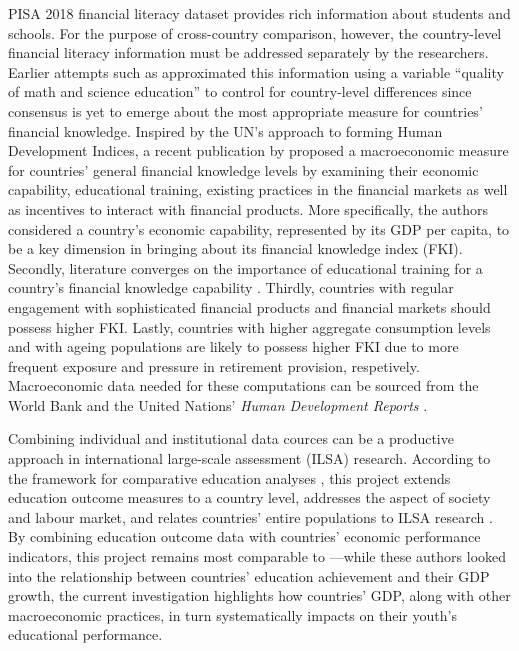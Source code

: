 \documentclass[a4paper,11pt,UKenglish,twoside,openright]{report}\usepackage[]{graphicx}\usepackage[]{color}
\begin{document}
PISA 2018 financial literacy dataset \parencite{FLdata} provides rich information about students and schools. For the purpose of cross-country comparison, however, the country-level financial literacy information must be addressed separately by the researchers. Earlier attempts such as \textcite{morenoherrero:2018a} approximated this information using a variable ``quality of math and science education'' to control for country-level differences since consensus is yet to emerge about the most appropriate measure for countries' financial knowledge. Inspired by the UN's approach to forming Human Development Indices, a recent publication by \textcite{olivermarquez:2020} proposed a macroeconomic measure for countries' general financial knowledge levels by examining their economic capability, educational training, existing practices in the financial markets as well as incentives to interact with financial products. More specifically, the authors considered a country's economic capability, represented by its GDP per capita, to be a key dimension in bringing about its financial knowledge index (FKI). Secondly, literature converges on the importance of educational training for a country's financial knowledge capability \parencite{oecd:2005}. Thirdly, countries with regular engagement with sophisticated financial products and financial markets should possess higher FKI. Lastly, countries with higher aggregate consumption levels and with ageing populations are likely to possess higher FKI due to more frequent exposure and pressure in retirement provision, respetively. Macroeconomic data needed for these computations can be sourced from the World Bank \parencite{worldbank:data} and the United Nations' \textit{Human Development Reports} \parencite{hdr:data}.

Combining individual and institutional data cources can be a productive approach in international large-scale assessment (ILSA) research. According to the framework for comparative education analyses \parencite{bray:1995}, this project extends education outcome measures to a country level, addresses the aspect of society and labour market, and relates countries' entire populations to ILSA research \parencite{strietholt:2018}. By combining education outcome data with countries' economic performance indicators, this project remains most comparable to \textcite{hanushek:2012a}---while these authors looked into the relationship between countries' education achievement and their GDP growth, the current investigation highlights how countries' GDP, along with other macroeconomic practices, in turn systematically impacts on their youth's educational performance.
\end{document}
